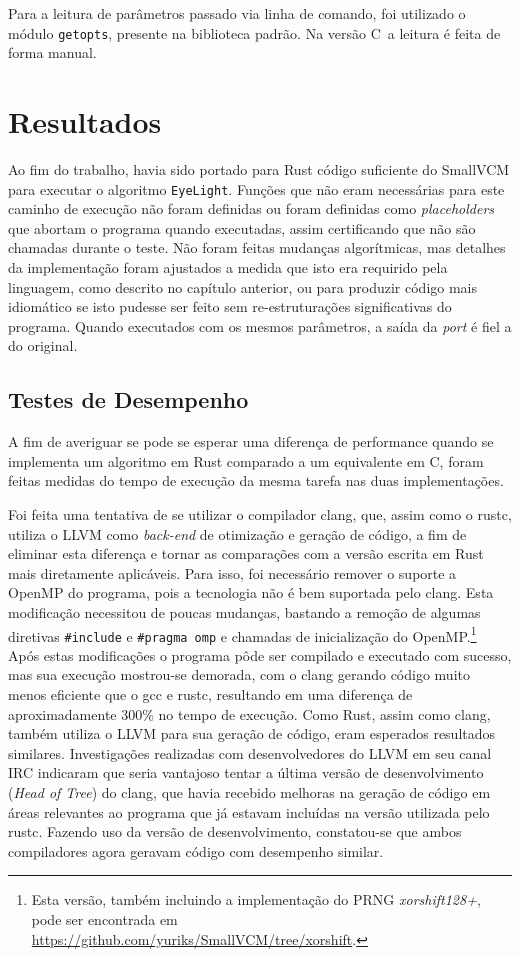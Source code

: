 \documentclass[tg]{mdtufsm}
\def\Cpp{{C\nolinebreak[4]\raisebox{.20ex}{\small\bf++}}}
\begin{document}
Para a leitura de parâmetros passado via linha de comando, foi utilizado o módulo \texttt{getopts}, presente na biblioteca padrão. Na versão \Cpp\ a leitura é feita de forma manual.

\chapter{Resultados}

Ao fim do trabalho, havia sido portado para Rust código suficiente do SmallVCM para executar o algoritmo \texttt{EyeLight}. Funções que não eram necessárias para este caminho de execução não foram definidas ou foram definidas como \emph{placeholders} que abortam o programa quando executadas, assim certificando que não são chamadas durante o teste. Não foram feitas mudanças algorítmicas, mas detalhes da implementação foram ajustados a medida que isto era requirido pela linguagem, como descrito no capítulo anterior, ou para produzir código mais idiomático se isto pudesse ser feito sem re-estruturações significativas do programa. Quando executados com os mesmos parâmetros, a saída da \emph{port} é fiel a do original.

\section{Testes de Desempenho}

A fim de averiguar se pode se esperar uma diferença de performance quando se implementa um algoritmo em Rust comparado a um equivalente em \Cpp, foram feitas medidas do tempo de execução da mesma tarefa nas duas implementações.

Foi feita uma tentativa de se utilizar o compilador clang, que, assim como o rustc, utiliza o LLVM como \emph{back-end} de otimização e geração de código, a fim de eliminar esta diferença e tornar as comparações com a versão escrita em Rust mais diretamente aplicáveis. Para isso, foi necessário remover o suporte a OpenMP do programa, pois a tecnologia não é bem suportada pelo clang. Esta modificação necessitou de poucas mudanças, bastando a remoção de algumas diretivas \texttt{\#include} e \texttt{\#pragma omp} e chamadas de inicialização do OpenMP.\footnote{Esta versão, também incluindo a implementação do PRNG \emph{xorshift128+}, pode ser encontrada em \url{https://github.com/yuriks/SmallVCM/tree/xorshift}.} Após estas modificações o programa pôde ser compilado e executado com sucesso, mas sua execução mostrou-se demorada, com o clang gerando código muito menos eficiente que o gcc e rustc, resultando em uma diferença de aproximadamente 300\% no tempo de execução. Como Rust, assim como clang, também utiliza o LLVM para sua geração de código, eram esperados resultados similares. Investigações realizadas com desenvolvedores do LLVM em seu canal IRC indicaram que seria vantajoso tentar a última versão de desenvolvimento (\emph{Head of Tree}) do clang, que havia recebido melhoras na geração de código em áreas relevantes ao programa que já estavam incluídas na versão utilizada pelo rustc. Fazendo uso da versão de desenvolvimento, constatou-se que ambos compiladores agora geravam código com desempenho similar.
\end{document}
